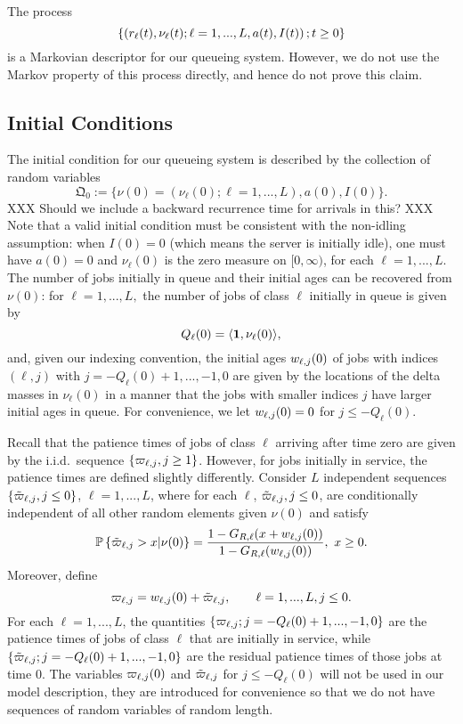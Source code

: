 \documentclass[stsy]{informs-stsy}
\begin{document}
The process
\[
\{\left( r_{\ell}(t), \nu_\ell(t);\ell=1,...,L,a(t),I(t) \right);t\geq0\}
\]
is a Markovian descriptor for our queueing system. However,  we do not use the Markov property of this process directly, and hence do not prove this claim.


\subsection{Initial Conditions\label{initialconditions}}
The initial condition for our queueing system is described by the collection of random variables
\begin{equation}\label{ic}
\mathfrak{Q}_0:=\{\nu(0)=(\nu_\ell(0);\ell=1,...,L),a(0),I(0)\}.
\end{equation}
XXX Should we include a backward recurrence time for arrivals   in this? XXX
Note that a valid initial condition must be consistent with the non-idling assumption: when $I(0)=0$ (which means the server is initially idle), one must have $a(0)=0$ and $\nu_\ell(0)$ is the zero measure on $[0, \infty)$,  for each $\ell=1,...,L$. The number of jobs initially in queue and their initial ages can be recovered from $\nu(0)$: for $\ell=1,...,L,$ the number of jobs of class $\ell$ initially in queue is given by 
\begin{equation}\label{QLzero}
Q_\ell(0)=\langle\f1,\nu_\ell(0) \rangle,
\end{equation}
and, given our indexing convention, the initial ages $w_{\ell,j}(0)$ of jobs with indices $(\ell,j)$ with $j=-Q_\ell(0)+1,...,-1,0$ are given by the locations of the delta masses in $\nu_\ell(0)$ in a manner that the jobs with smaller indices $j$ have larger initial ages in queue. For convenience, we let $w_{\ell,j}(0)=0$ for $j\leq -Q_\ell(0)$.

Recall that the patience times of jobs of class $\ell$ arriving after time zero are given by the i.i.d.\ sequence $\{\varpi_{\ell,j}, j\geq1\}$. However, for jobs initially in service, the patience times are defined slightly differently. Consider $L$ independent sequences $\{\tilde{\varpi}_{\ell,j},j\leq 0\}$, $\ell=1,...,L$, where for each $\ell$, $\tilde{\varpi}_{\ell,j},j\leq0$, are conditionally independent of all other random elements given $\nu(0)$ and satisfy
\[
\mathbb{P}\left\{\tilde{\varpi}_{\ell,j}>x|\nu(0)\right\}=\frac{1- G_{R,\ell}(x+w_{\ell,j}(0))}{1- G_{R,\ell}(w_{\ell,j}(0))}, \ x\geq 0.
\]
Moreover, define 
\begin{equation}\label{def_initial_age}
\varpi_{\ell,j}=w_{\ell,j}(0)+\tilde{\varpi}_{\ell,j},\quad\quad \ell=1,...,L,j\leq 0.
\end{equation}
For each $\ell=1,...,L$, the quantities $\{\varpi_{\ell,j};j=-Q_\ell(0)+1,...,-1,0\}$ are the patience times of jobs of class $\ell$ that are initially in service, while $\{\tilde{\varpi}_{\ell,j};j=-Q_\ell(0)+1,...,-1,0\}$ are the residual patience times of those jobs at time $0$. The variables $\varpi_{\ell,j}(0)$ and $\tilde {\varpi}_{\ell,j}$ for $j\leq -Q_\ell(0)$ will not be used in our model description, they are introduced for convenience so that we do not have sequences of random variables of random length.
\end{document}
